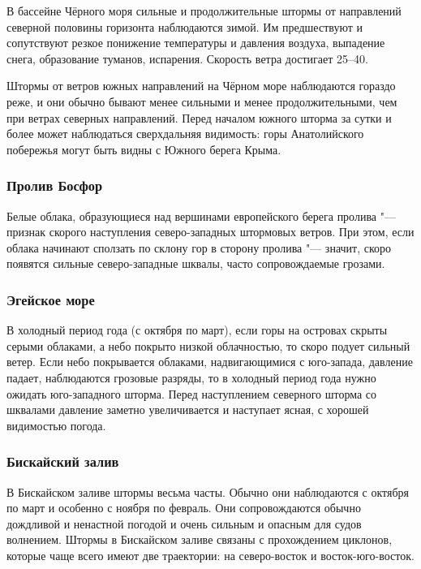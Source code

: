 В бассейне Чёрного моря сильные и продолжительные штормы от
направлений северной половины горизонта наблюдаются зимой. Им
предшествуют и сопутствуют резкое понижение температуры и давления
воздуха, выпадение снега, образование туманов, испарения. Скорость
ветра достигает 25--40\speedms.

Штормы от ветров южных направлений на Чёрном море наблюдаются гораздо
реже, и они обычно бывают менее сильными и менее продолжительными, чем
при ветрах северных направлений. Перед началом южного шторма за сутки
и более может наблюдаться сверхдальняя видимость: горы Анатолийского
побережья могут быть видны с Южного берега Крыма.

\subsubsection{Пролив Босфор}

Белые облака, образующиеся над вершинами европейского берега пролива "---
признак скорого наступления северо-западных штормовых ветров. При
этом, если облака начинают сползать по склону гор в сторону пролива "---
значит, скоро появятся сильные северо-западные шквалы, часто
сопровождаемые грозами.

\subsubsection{Эгейское море}

В холодный период года (с октября по март), если горы на островах
скрыты серыми облаками, а небо покрыто низкой облачностью, то скоро
подует сильный ветер. Если небо покрывается облаками, надвигающимися с
юго-запада, давление падает, наблюдаются грозовые разряды, то в
холодный период года нужно ожидать юго-западного шторма. Перед
наступлением северного шторма со шквалами давление заметно
увеличивается и наступает ясная, с хорошей видимостью погода.

\subsubsection{Бискайский залив}

В Бискайском заливе штормы весьма часты. Обычно они наблюдаются с
октября по март и особенно с ноября по февраль. Они сопровождаются
обычно дождливой и ненастной погодой и очень сильным и опасным для
судов волнением. Штормы в Бискайском заливе связаны с прохождением
циклонов, которые чаще всего имеют две траектории: на северо-восток и
восток-юго-восток.

